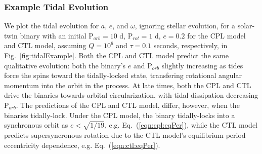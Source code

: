 \documentclass[twocolumn]{aastex61}
\begin{document}
\subsubsection{Example Tidal Evolution} \label{sec:methods:eqtideExample}

We plot the tidal evolution for $a$, $e$, and $\omega$, ignoring stellar evolution, for a solar-twin binary with an initial P$_{orb} = 10$ d, P$_{rot} = 1$ d, $e = 0.2$ for the CPL model and CTL model, assuming $Q=10^6$ and $\tau = 0.1$ seconds, respectively, in Fig.~\ref{fig:tidalExample}. Both the CPL and CTL model predict the same qualitative evolution: both the binary's $e$ and P$_{orb}$ slightly increasing as tides force the spins toward the tidally-locked state, transfering rotational angular momentum into the orbit in the process.  At late times, both the CPL and CTL drive the binaries towards orbital circularization, with tidal dissipation decreasing P$_{orb}$. The predictions of the CPL and CTL model, differ, however, when the binaries tidally-lock.  Under the CPL model, the binary tidally-locks into a synchronous orbit as $e < \sqrt{1/19}$, e.g. Eq.~(\ref{eqn:cpl:eqPer}), while the CTL model predicts supersyncronous rotation due to the CTL model's equilibrium period eccentricity dependence, e.g. Eq.~(\ref{eqn:ctl:eqPer}).
\end{document}
